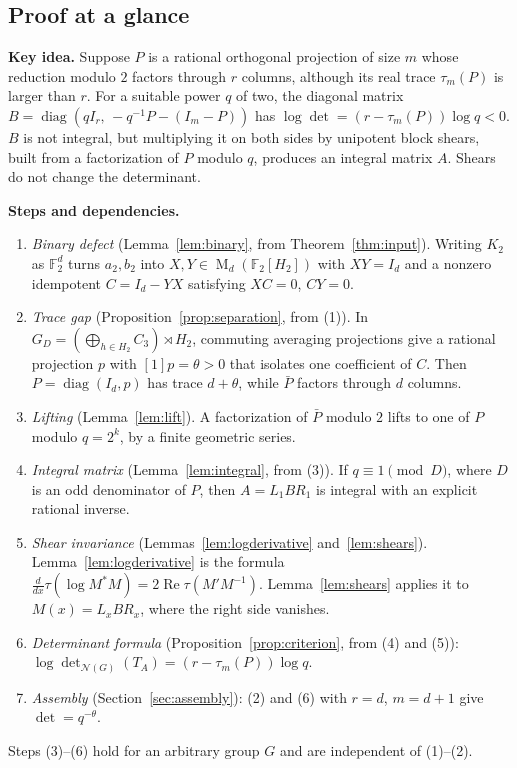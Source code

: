 \documentclass[11pt]{article}
\theoremstyle{remark}
\numberwithin{equation}{section}
\newcommand{\F}{\mathbb F}
\newcommand{\Mat}{\operatorname{M}}
\newcommand{\diag}{\operatorname{diag}}
\newcommand{\N}{\mathcal N}
\begin{document}
\subsection{Proof at a glance}

\textbf{Key idea.} Suppose $P$ is a rational orthogonal projection of size $m$ whose reduction modulo $2$ factors through $r$ columns, although its real trace $\tau_m(P)$ is larger than $r$. For a suitable power $q$ of two, the diagonal matrix $B=\diag(qI_r,\,-q^{-1}P-(I_m-P))$ has $\log\det=(r-\tau_m(P))\log q<0$. $B$ is not integral, but multiplying it on both sides by unipotent block shears, built from a factorization of $P$ modulo $q$, produces an integral matrix $A$. Shears do not change the determinant.

\textbf{Steps and dependencies.}
\begin{enumerate}[label=(\arabic*),leftmargin=2.2em,itemsep=2pt]
\item \emph{Binary defect} (Lemma~\ref{lem:binary}, from Theorem~\ref{thm:input}). Writing $K_2$ as $\F_2^d$ turns $a_2,b_2$ into $X,Y\in\Mat_d(\F_2[H_2])$ with $XY=I_d$ and a nonzero idempotent $C=I_d-YX$ satisfying $XC=0$, $CY=0$.
\item \emph{Trace gap} (Proposition~\ref{prop:separation}, from (1)). In $G_D=(\bigoplus_{h\in H_2}C_3)\rtimes H_2$, commuting averaging projections give a rational projection $p$ with $[1]p=\theta>0$ that isolates one coefficient of $C$. Then $P=\diag(I_d,p)$ has trace $d+\theta$, while $\bar P$ factors through $d$ columns.
\item \emph{Lifting} (Lemma~\ref{lem:lift}). A factorization of $\bar P$ modulo $2$ lifts to one of $P$ modulo $q=2^k$, by a finite geometric series.
\item \emph{Integral matrix} (Lemma~\ref{lem:integral}, from (3)). If $q\equiv1\pmod D$, where $D$ is an odd denominator of $P$, then $A=L_1BR_1$ is integral with an explicit rational inverse.
\item \emph{Shear invariance} (Lemmas~\ref{lem:logderivative} and~\ref{lem:shears}). Lemma~\ref{lem:logderivative} is the formula $\frac{d}{dx}\tau(\log M^*M)=2\operatorname{Re}\tau(M'M^{-1})$. Lemma~\ref{lem:shears} applies it to $M(x)=L_xBR_x$, where the right side vanishes.
\item \emph{Determinant formula} (Proposition~\ref{prop:criterion}, from (4) and (5)): $\log\det_{\N(G)}(T_A)=(r-\tau_m(P))\log q$.
\item \emph{Assembly} (Section~\ref{sec:assembly}): (2) and (6) with $r=d$, $m=d+1$ give $\det=q^{-\theta}$.
\end{enumerate}
Steps (3)--(6) hold for an arbitrary group $G$ and are independent of (1)--(2).
\end{document}
